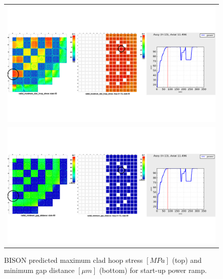 \documentclass[edeposit,fullpage,11pt]{uiucthesis2009}
\begin{document}
\begin{landscape}
\begin{figure}[h]
\begin{tabular}{c}
\includegraphics[trim={0 4cm 0 4cm},clip,width=\linewidth]{./Figures/bison_res/IPR_MCHS.pdf} \\
\includegraphics[trim={0 4cm 0 4cm},clip,width=\linewidth]{./Figures/bison_res/IPR_MGD.pdf} \\
\end{tabular}
\caption{BISON predicted maximum clad hoop stress $[MPa]$ (top) and minimum gap distance $[ \mu m]$ (bottom) for start-up power ramp.}
\label{fig:bison_initial}
\end{figure}
\end{landscape}
\end{document}

